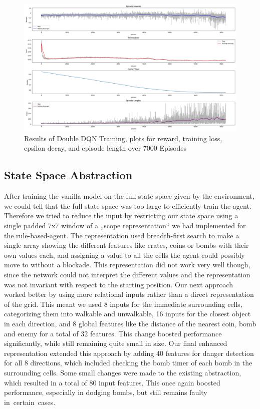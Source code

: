 \documentclass{article} %
\begin{document}
	\begin{figure}[h!]
		\centering
		\includegraphics[width=1.0\textwidth]{images/double_dqn_results}
		\caption{Results of Double DQN Training, plots for reward, training loss, epsilon decay, and episode length over 7000 Episodes}
		\label{fig:2}
	\end{figure}
	
	\newpage
	
	\subsection{State Space Abstraction}
	After training the vanilla model on the full state space given by the environment, we could tell that the full state space was too large to efficiently train the agent. Therefore we tried to reduce the input by restricting our state space using a single padded 7x7 window of a „scope representation“ we had implemented for the rule-based-agent. The representation used breadth-first search to make a single array showing the different features like crates, coins or bombs with their own values each, and assigning a value to all the cells the agent could possibly move to without a blockade. This representation did not work very well though, since the network could not interpret the different values and the representation was not invariant with respect to the starting position. 
	Our next approach worked better by using more relational inputs rather than a direct representation of the grid. This meant we used 8 inputs for the immediate surrounding cells, categorizing them into walkable and unwalkable, 16 inputs for the closest object in each direction, and 8 global features like the distance of the nearest coin, bomb and enemy for a total of 32 features. This change boosted performance significantly, while still remaining quite small in size. 
	Our final enhanced representation extended this approach by adding 40 features for danger detection for all 8 directions, which included checking the bomb timer of each bomb in the surrounding cells. Some small changes were made to the existing abstraction, which resulted in a total of 80 input features. This once again boosted performance, especially in dodging bombs, but still remains faulty in certain cases.
	
\end{document}
